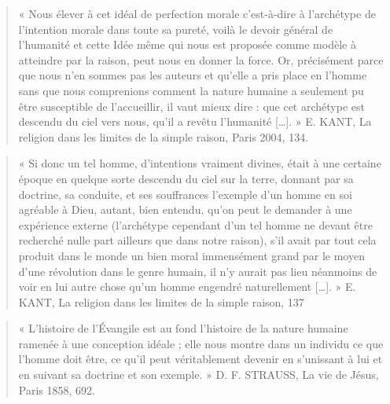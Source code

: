 \begin{quote}

   « Nous élever à cet idéal de perfection morale c’est-à-dire à l’archétype de l’intention morale
dans toute sa pureté, voilà le devoir général de l’humanité et cette Idée même qui nous est
proposée comme modèle à atteindre par la raison, peut nous en donner la force. Or,
précisément parce que nous n’en sommes pas les auteurs et qu’elle a pris place en l’homme
sans que nous comprenions comment la nature humaine a seulement pu être susceptible de
l’accueillir, il vaut mieux dire : que cet archétype est descendu du ciel vers nous, qu’il a
revêtu l’humanité […]. » E. KANT, La religion dans les limites de la simple raison, Paris
2004, 134. 
\end{quote}


\begin{quote}
« Si donc un tel homme, d’intentions vraiment divines, était à une certaine époque en quelque
sorte descendu du ciel sur la terre, donnant par sa doctrine, sa conduite, et ses souffrances
l’exemple d’un homme en soi agréable à Dieu, autant, bien entendu, qu’on peut le demander à
une expérience externe (l’archétype cependant d’un tel homme ne devant être recherché nulle
part ailleurs que dans notre raison), s’il avait par tout cela produit dans le monde un bien
moral immensément grand par le moyen d’une révolution dans le genre humain, il n’y aurait
pas lieu néanmoins de voir en lui autre chose qu’un homme engendré naturellement […]. » E.
KANT, La religion dans les limites de la simple raison, 137
    
\end{quote}


\begin{quote}
« L’histoire de l’Évangile est au fond l’histoire de la nature humaine ramenée à une
conception idéale ; elle nous montre dans un individu ce que l’homme doit être, ce qu’il peut
véritablement devenir en s’unissant à lui et en suivant sa doctrine et son exemple. » D. F.
STRAUSS, La vie de Jésus, Paris 1858, 692.
    
\end{quote}


\begin{quote}

    
\end{quote}